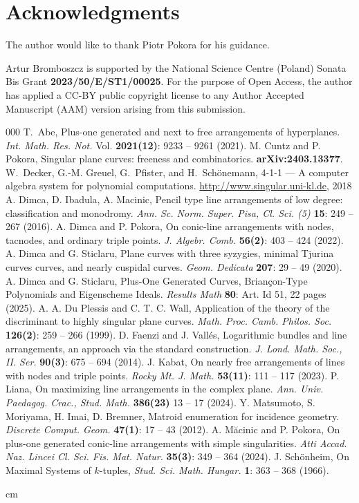 \documentclass[12pt]{article}
\theoremstyle{plain}
\theoremstyle{definition}
\begin{document}
\section*{Acknowledgments}
The author would like to thank Piotr Pokora for his guidance.

Artur Bromboszcz is supported by the National Science Centre (Poland) Sonata Bis Grant  \textbf{2023/50/E/ST1/00025}. For the purpose of Open Access, the author has applied a CC-BY public copyright license to any Author Accepted Manuscript (AAM) version arising from this submission.

\begin{thebibliography}{000}
T.~Abe, Plus-one generated and next to free arrangements of hyperplanes.
\textit{Int. Math. Res. Not.} Vol. {\bf 2021(12)}:  9233 -- 9261 (2021).
M. Cuntz and P. Pokora, Singular plane curves: freeness and combinatorics. \textbf{arXiv:2403.13377}.
W.~Decker, G.-M. Greuel, G.~Pfister, and H.~Sch\"onemann,
 {4-1-1} --- {A} computer algebra system for polynomial computations. \newblock \url{http://www.singular.uni-kl.de}, 2018
A. Dimca, D. Ibadula, A. Macinic, 
Pencil type line arrangements of low degree: classification and monodromy. 
\textit{Ann. Sc. Norm. Super. Pisa, Cl. Sci. (5)} \textbf{15}: 249 -- 267 (2016).
A. Dimca and P. Pokora, On conic-line arrangements with nodes, tacnodes, and ordinary triple points. \textit{J. Algebr. Comb.} \textbf{56(2)}: 403 -- 424 (2022).
A. Dimca and G. Sticlaru, Plane curves with three syzygies, minimal Tjurina curves curves, and nearly cuspidal curves. \textit{Geom. Dedicata}  {\bf 207}:  29 -- 49 (2020).
A. Dimca and G. Sticlaru, Plus-One Generated Curves, Briançon-Type Polynomials and Eigenscheme Ideals. \textit{Results Math}  \textbf{80}: Art. Id 51, 22 pages (2025).
A. A. Du Plessis and C. T. C. Wall, Application of the theory of the discriminant to highly singular plane curves. \textit{Math. Proc. Camb. Philos. Soc.} \textbf{126(2)}: 259 -- 266 (1999).
D. Faenzi and J. Vall\'es, Logarithmic bundles and line arrangements, an approach via the standard construction. \textit{J. Lond. Math. Soc., II. Ser.} \textbf{90(3)}: 675 -- 694 (2014).
J. Kabat, On nearly free arrangements of lines with nodes and triple points. \textit{Rocky Mt. J. Math.} \textbf{53(11)}: 111 -- 117 (2023).
P. Liana, On maximizing line arrangements in the complex plane. \textit{Ann. Univ. Paedagog. Crac., Stud. Math.} \textbf{386(23)} 13 -- 17 (2024).
Y. Matsumoto, S. Moriyama, H. Imai, D. Bremner, Matroid enumeration for incidence geometry. \textit{Discrete Comput. Geom.} \textbf{47(1)}: 17 -- 43 (2012).
A. M\u acinic and P. Pokora, On plus-one generated conic-line arrangements with simple singularities. \textit{Atti Accad. Naz. Lincei Cl. Sci. Fis. Mat. Natur.} \textbf{35(3)}: 349 -- 364 (2024).
J. Sch\"onheim, On Maximal Systems of $k$-tuples, \textit{Stud. Sci. Math. Hungar.} \textbf{1}: 363 -- 368 (1966).
\end{thebibliography}
 cm
\end{document}
